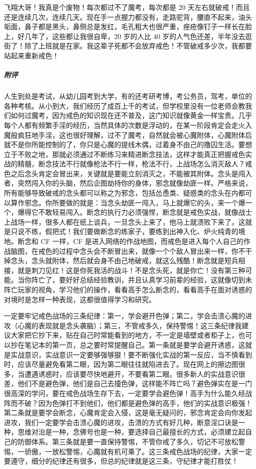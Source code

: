 \begin{case}
    飞翔大哥！我真是个废物！每次都过不了魔考，每次都是 20 天左右就破戒！而且还是连续几次，连续几天。现在手一点握力都没有，走路驼背，腰直不起来，油头垢面，鼻子都是黑头，鼻侧总是发红，毛孔粗大也很严重，痤疮像钉子一样长在脸上，好几年了，这些都让我很自卑，20 岁的人比 40 岁的人气色还差，半年没去逛街了！除了上班就是在家。我这辈子死都不会放弃戒色！不管破戒多少次，我都要站起来重新戒色！
    \subparagraph{附评} 人生到处是考试，从幼儿园考到大学，有的还考研考博，考公务员，驾考，单位的各种考核。从小到大，我们经历了成百上千的考试，但学校里没有一位老师会教我们如何过魔考，因为戒色的知识现在还不普及，这门知识就像黄金一样宝贵。几乎每个人都有频繁手淫的经历，当然具体的次数是浮动的，在某一阶段肯定会走火入魔般疯狂地手淫，这也很好理解，过不了魔考，自然就会被心魔附体，心魔附体后就不是你所能控制的了，你只是心魔的提线木偶，过着身不由己的撸囚生活。要想立于不败之地，那就必须通过不断练习来精进断念技法，这样才能真正把握戒色实战的精髓，断念技法不行就像枪法不行一样，枪法不行，上战场怎么消灭敌人？戒色之后念头肯定会冒出来，关键就是要能立刻消灭之，不能被其附体。念头是闯入者，突然闯入你的头脑，然后企图劫持你的身体，邪念就像劫匪一样。严格来说，所有能够导致破戒的念头都可以称之为邪念，包括怂恿类、疑惑类的念头在内都可以算作邪念。你所要做的就是：当念头劫匪一闯入，马上就爆它的头，来一个爆一个，爆得它不敢轻易闯入。断念的执行力必须强悍，断念就是戒色实战，就像战士上战场一样，很多人都在纸上谈兵，一旦念头上来了，他马上就溃败下来了，这就是只说不练，假把式！我们要做断念的练家子，要练到出神入化、炉火纯青的境地。断念和 CF 一样，CF 是进入网络的作战地图，而戒色是进入每个人自己的作战脑图，在戒色的过程中念头会不断冒出来，就像一个个敌人冒出来一样，你不干掉念头，念头就附体，然后就会身不由己地破戒，就这么残酷！断念就是短兵相接，就是刺刀见红！这是你死我活的战斗！不是念头死，就是你亡！没有第三种可能。当你阵亡了，要好好总结经验教训，并且认真学习前辈的经验，这就像切到未阵亡玩家的视角，学习他们的操作，看看高手怎么断念的，看看高手在面对诱惑的对境时是怎样一种表现，这都很值得学习和研究。

    一定要牢记戒色战场的三条纪律：第一，学会避开色弹；第二，学会击溃心魔的进攻（心魔的表现就是念头袭脑）；第三，不管戒多久，保持警惕！这三条纪律我建议大家把它抄下来，贴在自己时常能看到的地方，不一定是墙壁或者柜子上，也可以抄在笔记本的第一页，总之要时常提醒自己。第一条就是要学会避开诱惑，这就是实战意识，实战意识一定要够强够狠！要不断强化实战的第一反应，当不慎看到时，应该尽量避免看第二眼，因为第二眼往往就陷进去了。现在网上的擦边图很多，当遭遇诱惑时，应该要尽快地避开，不要看第二眼。很多新人的实战意识很差，他们不是避色弹，他们是自己去撞色弹，这样能不阵亡吗？避色弹实在是一门很高深的学问，要在戒色战场生存下去，一定要学会避色弹！高手为什么能久经战阵而不破？因为色弹打不到他们，他们都是避色弹的高手，他们的实战意识极强！第二条就是要学会断念，心魔肯定会入侵，这是毫无疑问的，邪念肯定会向你发起进攻，我们一定要学会击溃心魔的进攻，击溃的方式有好几种，断意淫口诀是一种，思维对治是一种，念佛号也是一种，要选择自己最擅长的方式，必须建立起自己的防御体系。第三条就是要一直保持警惕，不管你戒了多久，切记不可放松警惕，一骄傲，一放松警惕，心魔就有机可乘了。这三条戒色战场的纪律，大家一定要遵守，细分的纪律还有很多，但总的纪律就是这三条，守纪律才能打胜仗！


\end{case}
